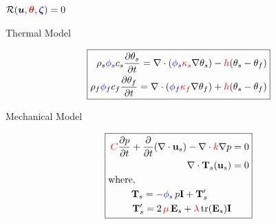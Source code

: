 \documentclass[10pt,xcolor=dvipsnames,compress]{beamer}
\begin{document}
\begin{frame}
\vspace{-0.1 in}
\begin{center}
    $\mathcal{R}(\boldsymbol{u},{\color{red}\bf \boldsymbol{\theta}},{\color{blue} \boldsymbol{\zeta}}) = 0$
\end{center}
\vspace{-0.1in}
\begin{minipage}{0.46\textwidth} 
\footnotesize
\begin{center}
   Thermal Model 
\end{center}
\begin{equation*}
\boxed{
\begin{aligned}
\rho_s \textcolor{blue}{\phi_s} c_s \frac{\partial {\theta}_s}{\partial t} = \nabla \cdot ( \textcolor{blue}{\phi_s} \textcolor{red}{\kappa_s} \nabla {\theta}_s) - \textcolor{red}{h} ({\theta}_s - {\theta}_f) 
\\ 
\rho_f \textcolor{blue}{\phi_f} c_f \frac{\partial {\theta}_f}{\partial t} = \nabla \cdot ( \textcolor{blue}{\phi_f} \textcolor{red}{\kappa_f} \nabla {\theta}_f) + \textcolor{red}{h} ({\theta}_s - {\theta}_f)
\end{aligned}
}
\end{equation*}
\normalsize
\end{minipage}
\hfill
\begin{minipage}{0.46\textwidth} 
\footnotesize
\begin{center}
Mechanical Model  
\end{center}
\begin{equation*}
\boxed{
\begin{aligned}
\textcolor{red}{C} \frac{\partial p}{\partial t} + \frac{\partial }{\partial t}(\nabla \cdot \mathbf{u}_s) - \nabla \cdot \textcolor{red}{k} \nabla p &= 0
\\ 
\nabla \cdot \mathbf{T}_s (\mathbf{u}_s) &= 0 
\\
\mathrm{where,}\qquad\qquad\qquad\qquad\qquad
\\
\mathbf{T}_s = -\textcolor{blue}{\phi_s}\,p\mathbf{I} + \mathbf{T}^\prime_s    \qquad\,\,\,
            \\
             \mathbf{T}^\prime_s = 2\,\textcolor{red}{\mu}\,\mathbf{E}_s + \textcolor{red}{\lambda}\,\mathrm{tr}(\mathbf{E}_s)\mathbf{I}
\end{aligned}
}
\end{equation*}
\normalsize
\end{minipage}

\vfill



\end{frame}
\end{document}
